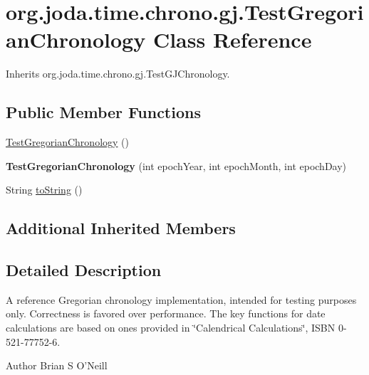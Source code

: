 \hypertarget{classorg_1_1joda_1_1time_1_1chrono_1_1gj_1_1_test_gregorian_chronology}{\section{org.\-joda.\-time.\-chrono.\-gj.\-Test\-Gregorian\-Chronology Class Reference}
\label{classorg_1_1joda_1_1time_1_1chrono_1_1gj_1_1_test_gregorian_chronology}
}


Inherits org.\-joda.\-time.\-chrono.\-gj.\-Test\-G\-J\-Chronology.

\subsection*{Public Member Functions}
\begin{DoxyCompactItemize}
\item 
\hyperlink{classorg_1_1joda_1_1time_1_1chrono_1_1gj_1_1_test_gregorian_chronology_a4c7e85daf01b2fbdfc61a1787148f83d}{Test\-Gregorian\-Chronology} ()
\item 
\hypertarget{classorg_1_1joda_1_1time_1_1chrono_1_1gj_1_1_test_gregorian_chronology_a42c64fcd54c17653967754b44623df88}{{\bfseries Test\-Gregorian\-Chronology} (int epoch\-Year, int epoch\-Month, int epoch\-Day)}\label{classorg_1_1joda_1_1time_1_1chrono_1_1gj_1_1_test_gregorian_chronology_a42c64fcd54c17653967754b44623df88}

\item 
String \hyperlink{classorg_1_1joda_1_1time_1_1chrono_1_1gj_1_1_test_gregorian_chronology_aed38c2cb780f7bd8f0db50d11561ce5d}{to\-String} ()
\end{DoxyCompactItemize}
\subsection*{Additional Inherited Members}


\subsection{Detailed Description}
A reference Gregorian chronology implementation, intended for testing purposes only. Correctness is favored over performance. The key functions for date calculations are based on ones provided in \char`\"{}\-Calendrical
\-Calculations\char`\"{}, I\-S\-B\-N 0-\/521-\/77752-\/6.

\begin{DoxyAuthor}{Author}
Brian S O'Neill 
\end{DoxyAuthor}


